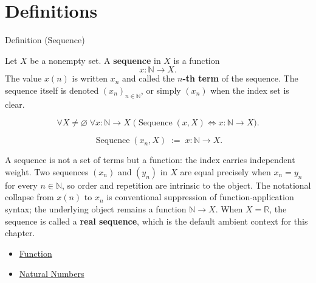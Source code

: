 
\section{Definitions}


\begin{definitionbox}{Definition (Sequence)}
\begin{definition}[Sequence]
\label{def:sequence}

Let $X$ be a nonempty set. A \textbf{sequence} in $X$ is a function
\[
    x : \mathbb{N} \to X.
\]
The value $x(n)$ is written $x_n$ and called the \textbf{$n$-th term} of the
sequence. The sequence itself is denoted $(x_n)_{n \in \mathbb{N}}$, or
simply $(x_n)$ when the index set is clear.
\end{definition}
\end{definitionbox}

\begin{remark*}
\[
\forall X \neq \varnothing \;\forall x : \mathbb{N} \to X
\;\bigl(\operatorname{Sequence}(x,X) \Longleftrightarrow x:\mathbb{N}\to X\bigr).
\]
\end{remark*}

\begin{remark*}
\[
\operatorname{Sequence}(x_n, X)
\;:=\;
x : \mathbb{N} \to X.
\]
\end{remark*}

\begin{remark*}[Interpretation]
A sequence is not a set of terms but a function: the index carries
independent weight. Two sequences $(x_n)$ and $(y_n)$ in $X$ are equal
precisely when $x_n = y_n$ for every $n \in \mathbb{N}$, so order and
repetition are intrinsic to the object. The notational collapse from
$x(n)$ to $x_n$ is conventional suppression of function-application
syntax; the underlying object remains a function $\mathbb{N} \to X$.
When $X = \mathbb{R}$, the sequence is called a \textbf{real sequence},
which is the default ambient context for this chapter.
\end{remark*}

\begin{dependencies}
\begin{itemize}
  \item \hyperref[def:function]{Function}
  \item \hyperref[def:natural-numbers]{Natural Numbers}
\end{itemize}
\end{dependencies}

